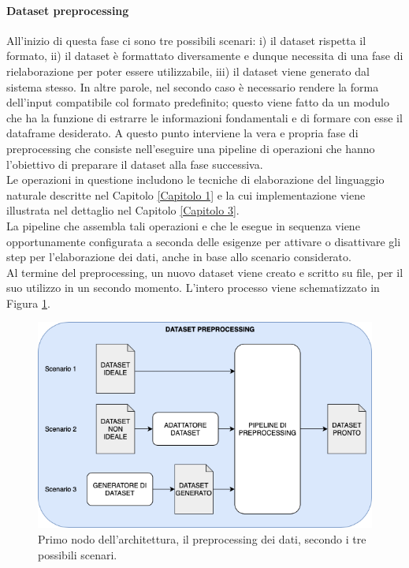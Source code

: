 \documentclass[12pt]{report}
\theoremstyle{definition}
\begin{document}
\paragraph{Dataset preprocessing} All'inizio di questa fase ci sono tre possibili scenari: i) il dataset rispetta il formato, ii) il dataset è formattato diversamente e dunque necessita di una fase di rielaborazione per poter essere utilizzabile, iii) il dataset viene generato dal sistema stesso.
In altre parole, nel secondo caso è necessario rendere la forma dell'input compatibile col formato predefinito; questo viene fatto da un modulo che ha la funzione di estrarre le informazioni fondamentali e di formare con esse il dataframe desiderato.
A questo punto interviene la vera e propria fase di preprocessing che consiste nell'eseguire una pipeline di operazioni che hanno l'obiettivo di preparare il dataset alla fase successiva.
\\
Le operazioni in questione includono le tecniche di elaborazione del linguaggio naturale descritte nel Capitolo \ref{Capitolo 1} e la cui implementazione viene illustrata nel dettaglio nel Capitolo \ref{Capitolo 3}.
\\
La pipeline che assembla tali operazioni e che le esegue in sequenza viene opportunamente configurata a seconda delle esigenze per attivare o disattivare gli step per l'elaborazione dei dati, anche in base allo scenario considerato.
\\
Al termine del preprocessing, un nuovo dataset viene creato e scritto su file, per il suo utilizzo in un secondo momento. L'intero processo viene schematizzato in Figura \ref{preprocessmodule}.

\begin{figure}
    \centering
    \includegraphics[scale=0.6]{images/preprocessingmodule.png}
    \caption{Primo nodo dell'architettura, il preprocessing dei dati, secondo i tre possibili scenari.}
    \label{preprocessmodule}
\end{figure}
\end{document}
